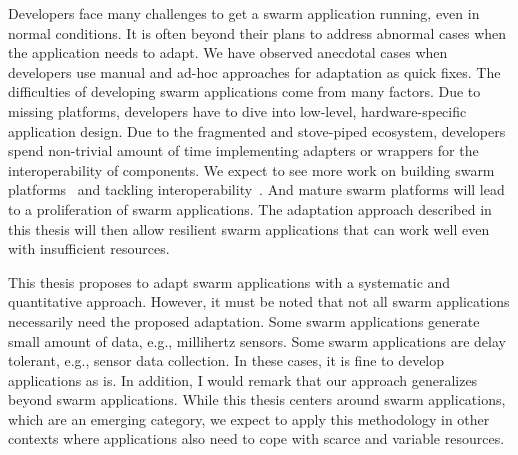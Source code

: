 \documentclass[thesis.tex]{subfiles}
\begin{document}
Developers face many challenges to get a swarm application running, even in
normal conditions. It is often beyond their plans to address abnormal cases when
the application needs to adapt. We have observed anecdotal cases when developers
use manual and ad-hoc approaches for adaptation as quick fixes. The difficulties
of developing swarm applications come from many factors. Due to missing
platforms, developers have to dive into low-level, hardware-specific application
design. Due to the fragmented and stove-piped ecosystem, developers spend
non-trivial amount of time implementing adapters or wrappers for the
interoperability of components.  We expect to see more work on building swarm
platforms~\cite{mor2016toward, latronico2015vision} and tackling
interoperability~\cite{brooks2018component}. And mature swarm platforms will
lead to a proliferation of swarm applications. The adaptation approach described
in this thesis will then allow resilient swarm applications that can work well
even with insufficient resources.

This thesis proposes to adapt swarm applications with a systematic and
quantitative approach. However, it must be noted that not all swarm applications
necessarily need the proposed adaptation. Some swarm applications generate small
amount of data, e.g., millihertz sensors. Some swarm applications are delay
tolerant, e.g., sensor data collection. In these cases, it is fine to develop
applications as is. In addition, I would remark that our approach generalizes
beyond swarm applications. While this thesis centers around swarm applications,
which are an emerging category, we expect to apply this methodology in other
contexts where applications also need to cope with scarce and variable
resources.
\end{document}
